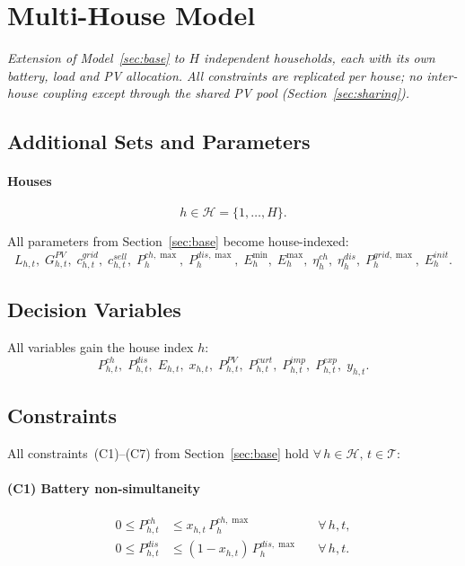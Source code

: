 \documentclass{article}
\begin{document}
\newpage
\section{Multi-House Model}
\label{sec:multihouse}

\textit{Extension of Model~\ref{sec:base} to $H$ independent households,
each with its own battery, load and PV allocation. All constraints are
replicated per house; no inter-house coupling except through the shared PV
pool (Section~\ref{sec:sharing}).}

\subsection{Additional Sets and Parameters}

\paragraph{Houses}
\[
  h \in \mathcal{H} = \{1, \dots, H\}.
\]

All parameters from Section~\ref{sec:base} become house-indexed:
\[
  L_{h,t},\; G^{PV}_{h,t},\; c^{grid}_{h,t},\; c^{sell}_{h,t},\;
  P^{ch,\max}_h,\; P^{dis,\max}_h,\; E^{\min}_h,\; E^{\max}_h,\;
  \eta^{ch}_h,\; \eta^{dis}_h,\; P^{grid,\max}_h,\; E^{init}_h.
\]

\subsection{Decision Variables}

All variables gain the house index $h$:
\[
  P^{ch}_{h,t},\; P^{dis}_{h,t},\; E_{h,t},\; x_{h,t},\;
  P^{PV}_{h,t},\; P^{curt}_{h,t},\; P^{imp}_{h,t},\; P^{exp}_{h,t},\; y_{h,t}.
\]

\subsection{Constraints}

All constraints~(C1)--(C7) from Section~\ref{sec:base} hold $\forall\,h \in \mathcal{H},\, t \in \mathcal{T}$:

\paragraph{(C1) Battery non-simultaneity}
\begin{align}
  0 \le P^{ch}_{h,t}  &\le x_{h,t}\,P^{ch,\max}_h   && \forall\,h,t, \\
  0 \le P^{dis}_{h,t} &\le (1-x_{h,t})\,P^{dis,\max}_h && \forall\,h,t.
\end{align}
\end{document}
